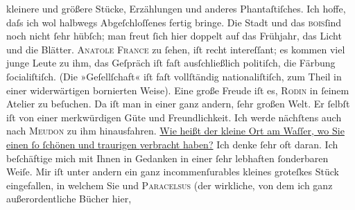 \begin{ledgroupsized}[t]{13cm}
               kleinere und größere Stücke, Erzählungen und anderes Phantaſtiſches. Ich hoffe, daſs
               ich wol halbwegs Abgeſchloſſenes fertig bringe.\pend
           \pstart
           Die Stadt und das \textsc{bois}ſind noch nicht ſehr hübſch; man freut ſich hier
               doppelt auf das Frühjahr, das Licht und die Blätter.\pend
           \pstart
           \textsc{Anatole France} zu ſehen, iſt recht intereſſant; es kommen {\pb}viel junge Leute zu ihm, das
               Geſpräch iſt faſt ausſchließlich politiſch, die Färbung ſocialiſtiſch. (Die
               »Geſellſchaft« iſt faſt vollſtändig nationaliſtiſch, zum Theil in einer widerwärtigen
               bornierten Weise).\pend
           \pstart
           Eine große Freude iſt es, \textsc{Rodin} in ſeinem Atelier zu beſuchen. Da iſt man in einer ganz andern, ſehr großen
               Welt. Er ſelbſt iſt von einer merkwürdigen Güte und Freundlichkeit. Ich {\pb}werde  nächſtens auch nach \textsc{Meudon} zu ihm hinausfahren.\pend
           \pstart
           \uline{Wie heißt der kleine Ort am Waſſer, wo Sie einen ſo ſchönen und traurigen
                     \label{K_L01021_1v}\label{K_L01021_1h} verbracht haben?} Ich denke ſehr oft daran.\pend
           \pstart
           Ich beſchäftige mich mit Ihnen in Gedanken in einer ſehr lebhaften ſonderbaren Weiſe.
               Mir iſt unter andern ein ganz incommenſurables kleines groteſkes Stück eingefallen, in welchem Sie und \textsc{Paracelsus} (der wirkliche, von dem ich ganz {\pb}außerordentliche Bücher hier,

\end{ledgroupsized}
